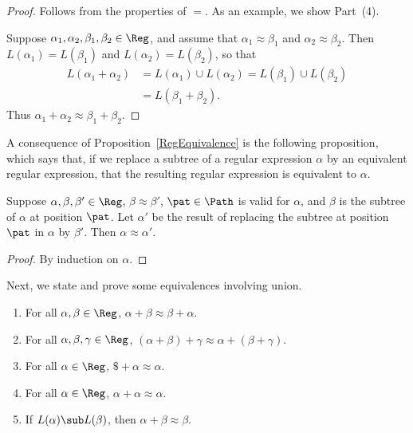 \begin{proof}
Follows from the properties of $=$.  As an example, we show
Part~(4).

Suppose $\alpha_1,\alpha_2,\beta_1,\beta_2\in\Reg$, and assume that
$\alpha_1\approx\beta_1$ and $\alpha_2\approx\beta_2$.
Then $L(\alpha_1)=L(\beta_1)$ and $L(\alpha_2)=L(\beta_2)$, so that
\begin{align*}
L(\alpha_1+\alpha_2) &= L(\alpha_1)\cup L(\alpha_2) =
L(\beta_1)\cup L(\beta_2) \\
&= L(\beta_1+\beta_2) .
\end{align*}
Thus $\alpha_1+\alpha_2\approx \beta_1+\beta_2$.
\end{proof}

A consequence of Proposition~\ref{RegEquivalence} is the following
proposition, which says that, if we replace a subtree of a regular
expression $\alpha$ by an equivalent regular expression, that the
resulting regular expression is equivalent to $\alpha$.

\begin{proposition}
\label{RegContext}
Suppose $\alpha,\beta,\beta'\in\Reg$, $\beta\approx\beta'$,
$\pat\in\Path$ is valid for $\alpha$, and $\beta$ is
the subtree of $\alpha$ at position $\pat$.
Let $\alpha'$ be the result of replacing the subtree at
position $\pat$ in $\alpha$ by $\beta'$.  Then $\alpha\approx\alpha'$.
\end{proposition}

\begin{proof}
By induction on $\alpha$.
\end{proof}

Next, we state and prove some equivalences involving union.

\begin{proposition}
\label{RegUnion}

\begin{enumerate}[(1)]
\item For all $\alpha,\beta\in\Reg$,
$\alpha + \beta\approx\beta + \alpha$.

\item For all $\alpha,\beta,\gamma\in\Reg$,
$(\alpha + \beta) + \gamma\approx\alpha + (\beta + \gamma)$.

\item For all $\alpha\in\Reg$, $\$ +
\alpha\approx\alpha$.

\item For all $\alpha\in\Reg$, $\alpha +
\alpha\approx\alpha$.

\item If $L(\alpha)\sub L(\beta)$, then $\alpha + \beta\approx
\beta$.
\end{enumerate}
\end{proposition}

